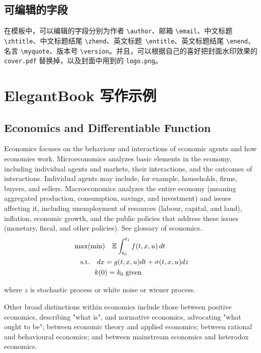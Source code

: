 \documentclass[titlestyle=hang,11pt]{elegantbook}
\begin{document}
\section{可编辑的字段}
在模板中，可以编辑的字段分别为作者 \verb|\author|、邮箱 \verb|\email|、中文标题 \verb|\zhtitle|、中文标题结尾 \verb|\zhend|、英文标题\verb| \entitle|、英文标题结尾 \verb|\enend|、名言 \verb|\myquote|、版本号 \verb|\version|。并且，可以根据自己的喜好把封面水印效果的 \verb|cover.pdf| 替换掉，以及封面中用到的 \verb|logo.png|。

\chapter{ElegantBook 写作示例}

\section{Economics and Differentiable Function}

Economics focuses on the behaviour and interactions of economic agents and how economies work. Microeconomics analyzes basic elements in the economy, including individual agents and markets, their interactions, and the outcomes of interactions. Individual agents may include, for example, households, firms, buyers, and sellers. Macroeconomics analyzes the entire economy (meaning aggregated production, consumption, savings, and investment) and issues affecting it, including unemployment of resources (labour, capital, and land), inflation, economic growth, and the public policies that address these issues (monetary, fiscal, and other policies). See glossary of economics.
\begin{align*}
   &\max(\min)\quad \mathbb{E}\int_{t_0}^{t_1}f(t,x,u)\,dt\\
   &\quad\mbox{s.t.} \quad dx=g(t,x,u)dt+\sigma(t,x,u)dz\\
   &\quad \hspace{2.em} k(0)=k_0\;\text{given}
\end{align*}

where $z$ is stochastic process or white noise or wiener process.

Other broad distinctions within economics include those between positive economics, describing "what is", and normative economics, advocating "what ought to be"; between economic theory and applied economics; between rational and behavioural economics; and between mainstream economics and heterodox economics.
\end{document}
